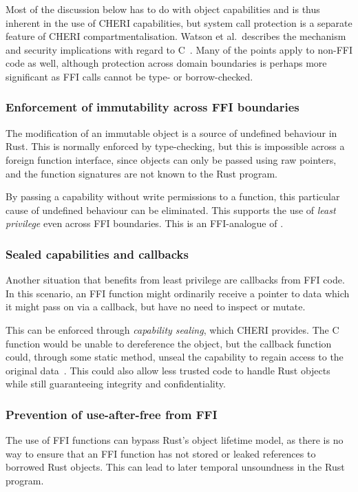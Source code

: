 \documentclass[dissertation.tex]{subfiles}
\begin{document}
Most of the discussion below has to do with object capabilities and is
thus inherent in the use of CHERI capabilities, but system call
protection is a separate feature of CHERI compartmentalisation.
Watson et al.\ describes the mechanism and security implications with
regard to C~\cite{cheri2015}.
Many of the points apply to non-FFI code as well, although protection
across domain boundaries is perhaps more significant as FFI calls cannot
be type- or borrow-checked.

\subsubsection{Enforcement of immutability across FFI boundaries}
The modification of an immutable object is a source of undefined
behaviour in Rust.
This is normally enforced by type-checking, but this is impossible
across a foreign function interface, since objects can only be passed
using raw pointers, and the function signatures are not known to the
Rust program.

By passing a capability without write permissions to a function, this
particular cause of undefined behaviour can be eliminated.
This supports the use of \emph{least privilege} even across FFI
boundaries.
This is an FFI-analogue of .

\subsubsection{Sealed capabilities and callbacks}
Another situation that benefits from least privilege are callbacks from
FFI code.
In this scenario, an FFI function might ordinarily receive a pointer to
data which it might pass on via a callback, but have no need to inspect
or mutate.

This can be enforced through \emph{capability sealing}, which CHERI
provides.
The C function would be unable to dereference the object, but the
callback function could, through some static method, unseal the
capability to regain access to the original data~\cite{cheri-v6}.
This could also allow less trusted code to handle Rust objects while
still guaranteeing integrity and confidentiality.

\subsubsection{Prevention of use-after-free from FFI}
The use of FFI functions can bypass Rust's object lifetime model, as
there is no way to ensure that an FFI function has not stored or leaked
references to borrowed Rust objects.
This can lead to later temporal unsoundness in the Rust program.
\end{document}
